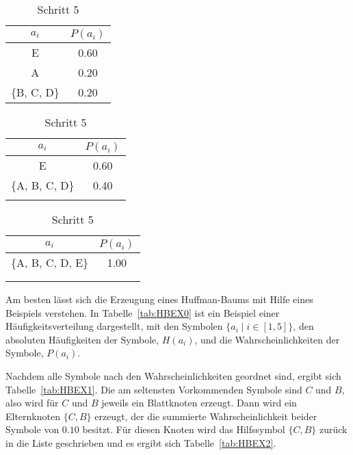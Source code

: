 \documentclass[twoside,11pt,a4paper]{article}
\theoremstyle{break}
\begin{document}
\begin{table}[h]
\begin{subtable}[t]{0.3\textwidth}
  \centering
  \caption{Schritt 3}
   \begin{tabular}{c|c}
    $a_i$ & $P(a_i)$ \\ \hline
    E & 0.60 \\
    A & 0.20 \\
    \{B, C, D\} & 0.20 \\
  \end{tabular}
  \label{tab:HBEX3}
\end{subtable}
\begin{subtable}[t]{0.3\textwidth}
  \centering
  \caption{Schritt 4}
   \begin{tabular}{c|c}
    $a_i$ & $P(a_i)$ \\ \hline
    E & 0.60 \\
    \{A, B, C, D\} & 0.40 \\ \\
  \end{tabular}
  \label{tab:HBEX4}
\end{subtable}
\begin{subtable}[t]{0.3\textwidth}
  \centering
  \caption{Schritt 5}
  \begin{tabular}{c|c}
    $a_i$ & $P(a_i)$ \\ \hline
    \{A, B, C, D, E\} & 1.00 \\ \\ \\
  \end{tabular}
  \label{tab:HBEX5}
\end{subtable}
\label{tab:HBEX}
\end{table}

Am besten lässt sich die Erzeugung eines Huffman-Baums mit Hilfe eines
Beispiels verstehen. In Tabelle~\ref{tab:HBEX0} ist ein Beispiel einer
Häufigkeitsverteilung dargestellt, mit den Symbolen $\{a_i \mid i \in
[1, 5]\}$, den absoluten Häufigkeiten der Symbole, $H(a_i)$, und die
Wahrscheinlichkeiten der Symbole, $P(a_i)$.

Nachdem alle Symbole nach den Wahrscheinlichkeiten geordnet sind,
ergibt sich Tabelle~\ref{tab:HBEX1}. Die am seltensten Vorkommenden
Symbole sind $C$ und $B$, also wird für $C$ und $B$ jeweils ein
Blattknoten erzeugt. Dann wird ein Elternknoten $\{C, B\}$ erzeugt,
der die summierte Wahrscheinlichkeit beider Symbole von $0.10$
besitzt. Für diesen Knoten wird das Hilfssymbol $\{C, B\}$ zurück in
die Liste geschrieben und es ergibt sich Tabelle~\ref{tab:HBEX2}.
\end{document}
